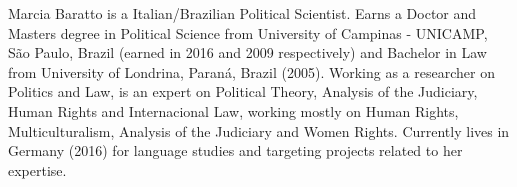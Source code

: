 
\begin{cvparagraph}

Marcia Baratto is a Italian/Brazilian Political Scientist. Earns a Doctor and Masters degree in Political Science from University of Campinas - UNICAMP, São Paulo, Brazil (earned in 2016 and 2009 respectively) and Bachelor in Law from University of Londrina, Paraná, Brazil (2005). Working as a researcher on Politics and Law, is an expert on Political Theory, Analysis of the Judiciary, Human Rights and Internacional Law, working mostly on Human Rights, Multiculturalism, Analysis of the Judiciary and Women Rights. Currently lives in Germany (2016) for language studies and targeting projects related to her expertise.

\end{cvparagraph}
